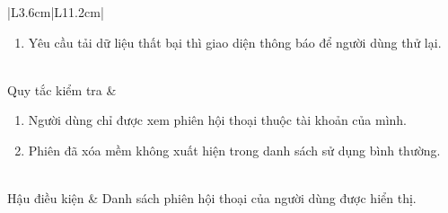\documentclass[12pt,a4paper,oneside]{report}
\begin{document}
{\begin{longtable}{|L{3.6cm}|L{11.2cm}|}
\begin{enumerate}[leftmargin=*,nosep]
                            \item Yêu cầu tải dữ liệu thất bại thì giao diện thông báo để người dùng thử lại.
                          \end{enumerate} \\
    \hline
    Quy tắc kiểm tra    & \begin{enumerate}[leftmargin=*,nosep]
                            \item Người dùng chỉ được xem phiên hội thoại thuộc tài khoản của mình.
                            \item Phiên đã xóa mềm không xuất hiện trong danh sách sử dụng bình thường.
                          \end{enumerate}                \\
    \hline
    Hậu điều kiện       & Danh sách phiên hội thoại của người dùng được hiển thị.                                   \\
    \hline
  \end{longtable}
}
\end{document}
